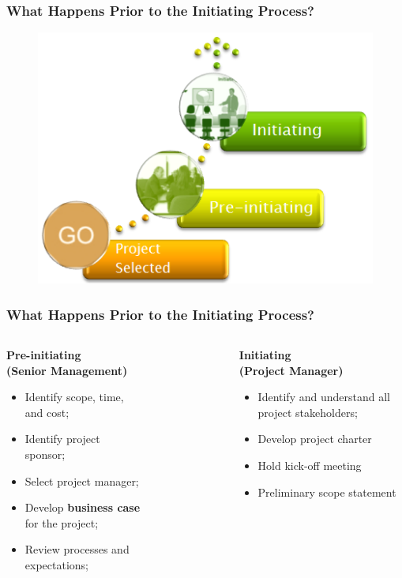 \documentclass{beamer}
\begin{document}
\begin{frame}
\frametitle{What Happens Prior to the Initiating Process?}
\begin{figure}
\includegraphics[scale=0.8]{init}
\end{figure}
\end{frame}

\begin{frame}
\frametitle{What Happens Prior to the Initiating Process?}
\begin{columns}
\begin{tcolorbox}
\textbf{Pre-initiating}\\
\textbf{(Senior Management)}
\begin{itemize}
\item Identify scope, time, and cost;
\item Identify project sponsor;
\item Select project manager;
\item Develop \textbf{business case} for the project;
\item Review processes and expectations;
\end{itemize}
\end{tcolorbox}
\begin{figure}
\end{figure}
\begin{tcolorbox}
\textbf{Initiating}\\
\textbf{(Project Manager)}
\begin{itemize}
\item Identify and understand all project stakeholders;
\item Develop project charter
\item Hold kick-off meeting
\item Preliminary scope statement
\end{itemize}
\end{tcolorbox}
\end{columns}
\end{frame}
\end{document}
